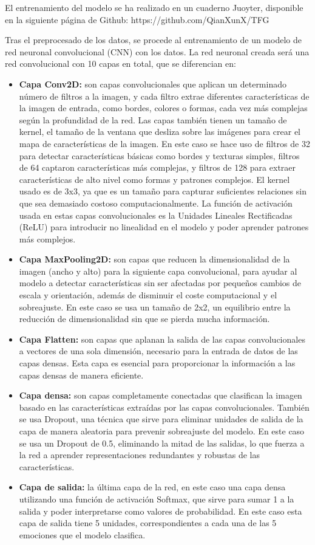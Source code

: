 \documentclass[12pt]{report} %
\begin{document}
El entrenamiento del modelo se ha realizado en un cuaderno Juoyter, disponible en la siguiente página de Github: https://github.com/QianXunX/TFG

Tras el preprocesado de los datos, se procede al entrenamiento de un modelo de red neuronal convolucional (CNN) con los datos. La red neuronal creada será una red convolucional con 10 capas en total, que se diferencian en:

\begin{itemize}

    \item \textbf{Capa Conv2D:} son capas convolucionales que aplican un determinado número de filtros a la imagen, y cada filtro extrae diferentes características de la imagen de entrada, como bordes, colores o formas, cada vez más complejas según la profundidad de la red. Las capas también tienen un tamaño de kernel, el tamaño de la ventana que desliza sobre las imágenes para crear el mapa de características de la imagen. En este caso se hace uso de filtros de 32 para detectar características básicas como bordes y texturas simples, filtros de 64 captaron características más complejas, y filtros de 128 para extraer características de alto nivel como formas y patrones complejos. El kernel usado es de 3x3, ya que es un tamaño para capturar suficientes relaciones sin que sea demasiado costoso computacionalmente. La función de activación usada en estas capas convolucionales es la  Unidades Lineales Rectificadas (ReLU) para introducir no linealidad en el modelo y poder aprender patrones más complejos.
    \item \textbf{Capa MaxPooling2D:} son capas que reducen la dimensionalidad de la imagen (ancho y alto) para la siguiente capa convolucional, para ayudar al modelo a detectar características sin ser afectadas por pequeños cambios de escala y orientación, además de disminuir el coste computacional y el sobreajuste. En este caso se usa un tamaño de 2x2, un equilibrio entre la reducción de dimensionalidad sin que se pierda mucha información.
    \item \textbf{Capa Flatten:} son capas que aplanan la salida de las capas convolucionales a vectores de una sola dimensión, necesario para la entrada de datos de las capas densas. Esta capa es esencial para proporcionar la información a las capas densas de manera eficiente.
	\item \textbf{Capa densa:} son capas completamente conectadas que clasifican la imagen basado en las características extraídas por las capas convolucionales. También se usa Dropout, una técnica que sirve para eliminar unidades de salida de la capa de manera aleatoria para prevenir sobreajuste del modelo. En este caso se usa un Dropout de 0.5, eliminando la mitad de las salidas, lo que fuerza a la red a aprender representaciones redundantes y robustas de las características. 
	\item \textbf{Capa de salida:} la última capa de la red, en este caso una capa densa utilizando una función de activación Softmax, que sirve para sumar 1 a la salida y poder interpretarse como valores de probabilidad. En este caso esta capa de salida tiene 5 unidades, correspondientes a cada una de las 5 emociones que el modelo clasifica.


\end{itemize}
\end{document}
